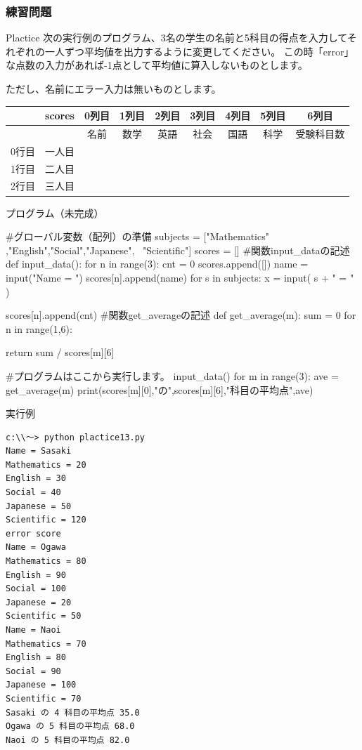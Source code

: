 \documentclass[11pt,a4paper,dvipdfmx,titlepage]{jsreport}
\begin{document}
\subsubsection{練習問題}
\begin{plabox}{Plactice}
次の実行例のプログラム、3名の学生の名前と5科目の得点を入力してそれぞれの一人ずつ平均値を出力するように変更してください。
この時「error」な点数の入力があれば-1点として平均値に算入しないものとします。

ただし、名前にエラー入力は無いものとします。


\begin{center}
\begin{tabular}{|c|c|c|c|c|c|c|c|c|} \hline
       &scores&0列目&1列目&2列目&3列目&4列目&5列目&6列目 \\ \hline \hline
       & &名前&数学&英語&社会&国語&科学&受験科目数\\ \hline 
0行目  & 一人目& & & & & & &\\ \hline
1行目  & 二人目& & & & & & &\\ \hline
2行目  & 三人目& & & & & & &\\ \hline
\end{tabular}
\end{center}

\begin{codebox}{プログラム（未完成）}
\begin{listing}{1}
#グローバル変数（配列）の準備
subjects = ["Mathematics" ,"English","Social","Japanese", \
			"Scientific"]
scores = []
#関数input_dataの記述
def input_data():
    for n in range(3):
        cnt = 0
        scores.append([])
        name = input("Name = ")
        scores[n].append(name)
        for s in subjects:
            x = input( s + " = " )
            
            
            
            
            
            
            
        scores[n].append(cnt)
#関数get_averageの記述
def get_average(m):
    sum = 0
    for n in range(1,6):
        
        
    return sum / scores[m][6]

#プログラムはここから実行します。
input_data()
for m in range(3):
    ave = get_average(m)
    print(scores[m][0],"の",scores[m][6],"科目の平均点",ave)
\end{listing}
\end{codebox}
\begin{codebox}{実行例}
\begin{verbatim}
c:\\～> python plactice13.py
Name = Sasaki
Mathematics = 20
English = 30
Social = 40
Japanese = 50
Scientific = 120
error score
Name = Ogawa
Mathematics = 80
English = 90
Social = 100
Japanese = 20
Scientific = 50
Name = Naoi
Mathematics = 70
English = 80
Social = 90
Japanese = 100
Scientific = 70
Sasaki の 4 科目の平均点 35.0
Ogawa の 5 科目の平均点 68.0
Naoi の 5 科目の平均点 82.0
\end{verbatim}
\end{codebox}
\end{plabox}
\newpage
\end{document}
